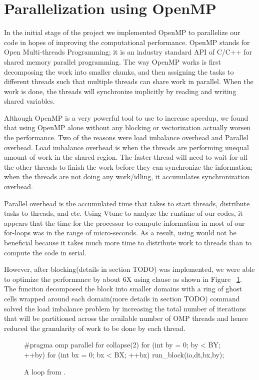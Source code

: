 \section{Parallelization using OpenMP}\label{sec:parallelization}

In the initial stage of the project we implemented OpenMP to parallelize our code in hopes of improving the computational performance. OpenMP stands for Open Multi-threads Programming; it is an industry standard API of C/C++ for shared memory parallel programming.  The way OpenMP works is first decomposing the work into smaller chunks, and then assigning the tasks to different threads such that multiple threads can share work in parallel. When the work is done, the threads will synchronize implicitly by reading and writing shared variables.

Although OpenMP is a very powerful tool to use to increase speedup, we found that using OpenMP alone without any blocking or vectorization actually worsen the performance. Two of the reasons were load imbalance overhead and Parallel overhead. Load imbalance overhead is when the threads are performing unequal amount of work in the shared region. The faster thread will need to wait for all the other threads to finish the work before they can synchronize the information; when the threads are not doing any work/idling, it accumulates synchronization overhead.

Parallel overhead is the accumulated time that takes to start threads, distribute tasks to threads, and etc. Using Vtune to analyze the runtime of our codes, it appears that the time for the processor to compute information in most of our for-loops was in the range of micro-seconds. As a result, using  would not be beneficial because it takes much more time to distribute work to threads than to compute the code in serial.

However, after blocking(details in section TODO) was implemented, we were able to optimize the performance by about 6X using  clause as shown in Figure ~\ref{fig:omp}. The  funciton decomposed the block into smaller domains with a ring of ghost cells wrapped around each domain(more details in section TODO)  command solved the load imbalance problem by increasing the total number of iterations that will be partitioned across the available number of OMP threads and hence reduced the granularity of work to be done by each thread.

\begin{figure}[h]
\centering
\begin{CPP}[firstnumber=476]
 #pragma omp parallel for collapse(2)
      for (int by = 0; by < BY; ++by) {
         for (int bx = 0; bx < BX; ++bx) {
              run_block(io,dt,bx,by);
                 }
           }
\end{CPP}
\caption{A loop from .}
\label{fig:omp}
\end{figure}
